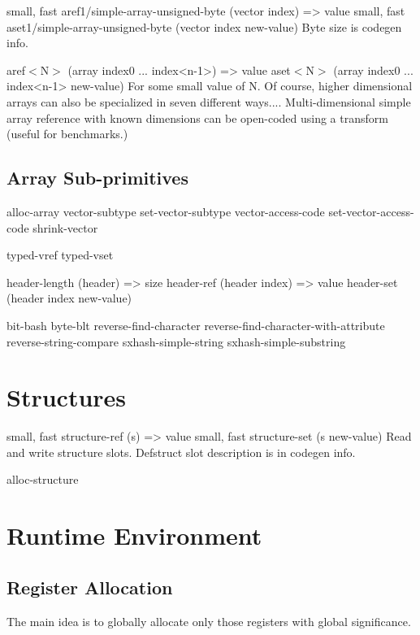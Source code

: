 {\begin{itemize, spread 0, spacing 1}
{small, fast} aref1/simple-array-unsigned-byte (vector index) => value
{small, fast} aset1/simple-array-unsigned-byte (vector index new-value)
    Byte size is codegen info.

aref$<$N$>$ (array index0 ... index<n-1>) => value
aset$<$N$>$ (array index0 ... index<n-1> new-value)
    For some small value of N.  Of course, higher dimensional arrays can also
    be specialized in seven different ways....  Multi-dimensional simple array
    reference with known dimensions can be open-coded using a transform (useful
    for benchmarks.)


\section{Array Sub-primitives}

alloc-array
vector-subtype
set-vector-subtype
vector-access-code
set-vector-access-code
shrink-vector

typed-vref
typed-vset

header-length (header) => size
header-ref (header index) => value
header-set (header index new-value)

bit-bash
byte-blt
{reverse-}find-character
{reverse-}find-character-with-attribute
{reverse-}string-compare
sxhash-simple-string
sxhash-simple-substring

\chapter{Structures}

{small, fast} structure-ref (s) => value
{small, fast} structure-set (s new-value)
    Read and write structure slots.  Defstruct slot description is in codegen
    info.

alloc-structure

\chapter{Runtime Environment}
\label{Runtime}

\section{Register Allocation}

The main idea is to globally allocate only those registers with global
significance.


\end{itemize, spread 0, spacing 1}}
